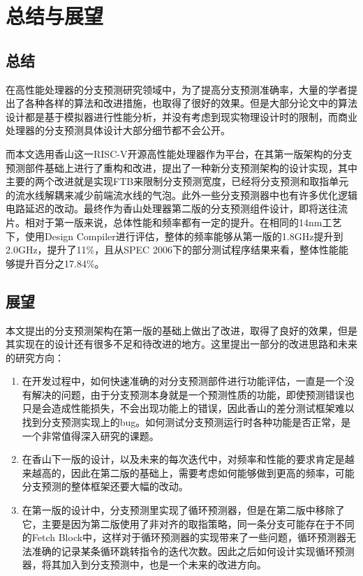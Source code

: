 
\chapter{总结与展望}

\section{总结}

在高性能处理器的分支预测研究领域中，为了提高分支预测准确率，大量的学者提出了各种各样的算法和改进措施，也取得了很好的效果。但是大部分论文中的算法设计都是基于模拟器进行性能分析，并没有考虑到现实物理设计时的限制，而商业处理器的分支预测具体设计大部分细节都不会公开。

而本文选用香山这一RISC-V开源高性能处理器作为平台，在其第一版架构的分支预测部件基础上进行了重构和改进，提出了一种新分支预测架构的设计实现，其中主要的两个改进就是实现FTB来限制分支预测宽度，已经将分支预测和取指单元的流水线解耦来减少前端流水线的气泡。此外一些分支预测器中也有许多优化逻辑电路延迟的改动。最终作为香山处理器第二版的分支预测组件设计，即将送往流片。相对于第一版来说，总体性能和频率都有一定的提升。在相同的14nm工艺下，使用Design Compiler进行评估，整体的频率能够从第一版的1.8GHz提升到2.0GHz，提升了11\%，且从SPEC 2006下的部分测试程序结果来看，整体性能能够提升百分之17.84\%。

\section{展望}

本文提出的分支预测架构在第一版的基础上做出了改进，取得了良好的效果，但是其实现在的设计还有很多不足和待改进的地方。这里提出一部分的改进思路和未来的研究方向：

\begin{enumerate}
    \item 在开发过程中，如何快速准确的对分支预测部件进行功能评估，一直是一个没有解决的问题，由于分支预测本身就是一个预测性质的功能，即使预测错误也只是会造成性能损失，不会出现功能上的错误，因此香山的差分测试框架难以找到分支预测实现上的bug。如何测试分支预测运行时各种功能是否正常，是一个非常值得深入研究的课题。
    \item 在香山下一版的设计，以及未来的每次迭代中，对频率和性能的要求肯定是越来越高的，因此在第二版的基础上，需要考虑如何能够做到更高的频率，可能分支预测的整体框架还要大幅的改动。
    \item 在第一版的设计中，分支预测里实现了循环预测器，但是在第二版中移除了它，主要是因为第二版使用了非对齐的取指策略，同一条分支可能存在于不同的Fetch Block中，这样对于循环预测器的实现带来了一些问题，循环预测器无法准确的记录某条循环跳转指令的迭代次数。因此之后如何设计实现循环预测器，将其加入到分支预测中，也是一个未来的改进方向。
\end{enumerate}

